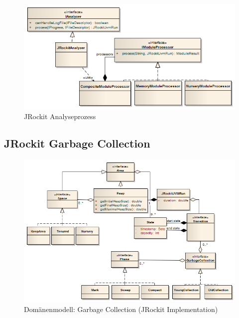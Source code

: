  \begin{figure}[H]
  	\centering
        	\caption{JRockit Analyseprozess}
    	\includegraphics[width=16cm]{images/jrockit_log_processing}
\end{figure}

\subsection{JRockit Garbage Collection}
\begin{landscape}
 \begin{figure}[H]
  	\centering
        	\caption{Domänenmodell: Garbage Collection (JRockit Implementation)}
    	\includegraphics[width=19.5cm]{images/jrockit_extension_domain}
\end{figure}
\end{landscape}

